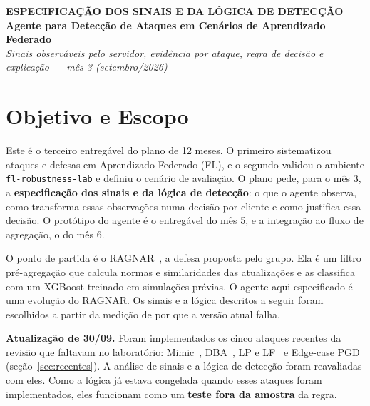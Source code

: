 \documentclass[11pt,a4paper]{article}
\begin{document}
\begin{center}
    \vspace*{10pt}
    {\color{primary}\fontsize{20}{24}\selectfont\textbf{ESPECIFICAÇÃO DOS SINAIS E DA LÓGICA DE DETECÇÃO}} \\[8pt]
    {\color{secondary}\fontsize{13}{16}\selectfont\textbf{Agente para Detecção de Ataques em Cenários de Aprendizado Federado}} \\[12pt]
    {\color{gray}\fontsize{9}{11}\selectfont\textit{Sinais observáveis pelo servidor, evidência por ataque, regra de decisão e explicação --- mês 3 (setembro/2026)}} \\[8pt]
    \noindent\makebox[\linewidth]{\color{secondary!50}\rule{\textwidth}{1.2pt}}
    \vspace*{10pt}
\end{center}

\section*{Objetivo e Escopo}
Este é o terceiro entregável do plano de 12 meses. O primeiro sistematizou ataques e defesas em
Aprendizado Federado (FL), e o segundo validou o ambiente \texttt{fl-robustness-lab} e definiu o cenário
de avaliação. O plano pede, para o mês 3, a \textbf{especificação dos sinais e da lógica de detecção}: o que
o agente observa, como transforma essas observações numa decisão por cliente e como justifica essa
decisão. O protótipo do agente é o entregável do mês 5, e a integração ao fluxo de agregação, o do mês 6.

O ponto de partida é o RAGNAR~\cite{ragnar}, a defesa proposta pelo grupo. Ela é um filtro
pré-agregação que calcula normas e similaridades das atualizações e as classifica com um XGBoost treinado
em simulações prévias. O agente aqui especificado é uma evolução do RAGNAR. Os sinais e a lógica
descritos a seguir foram escolhidos a partir da medição de por que a versão atual falha.

\textbf{Atualização de 30/09.} Foram implementados os cinco ataques recentes da revisão que faltavam no
laboratório: Mimic~\cite{mimic}, DBA~\cite{dba}, LP e LF~\cite{bclayers} e Edge-case PGD~\cite{edgecase}
(seção~\ref{sec:recentes}). A análise de sinais e a lógica de detecção foram reavaliadas com eles. Como a
lógica já estava congelada quando esses ataques foram implementados, eles funcionam como um
\textbf{teste fora da amostra} da regra.
\end{document}
